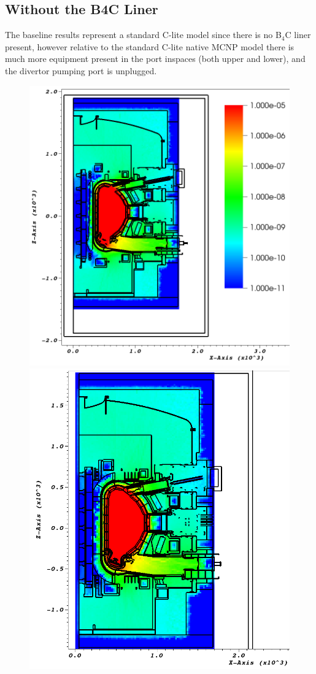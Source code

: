 \documentclass[12pt]{article}
\begin{document}
\subsection{Without the B4C Liner}
The baseline results represent a standard C-lite model since there is no B$_4$C liner present, however relative to the standard C-lite native MCNP model there is much more equipment present in the port inspaces (both upper and lower), and the divertor pumping port is unplugged. 
\begin{figure}[ht!]
  \centering
  \includegraphics[scale=0.35]{../plots/neutron/nob4c/y_0.png}
  \includegraphics[scale=0.35]{../plots/neutron/nob4c/y_-17.png}

\end{figure}
\end{document}
